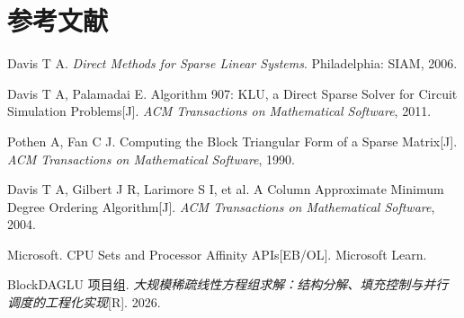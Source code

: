 \documentclass[12pt,a4paper,fontset=none]{ctexart}
\begin{document}
\section*{参考文献}

\begin{enumerate}[label={[}\arabic*{]}]
  \item Davis T A. \textit{Direct Methods for Sparse Linear Systems}. Philadelphia: SIAM, 2006.
  \item Davis T A, Palamadai E. Algorithm 907: KLU, a Direct Sparse Solver for Circuit Simulation Problems[J]. \textit{ACM Transactions on Mathematical Software}, 2011.
  \item Pothen A, Fan C J. Computing the Block Triangular Form of a Sparse Matrix[J]. \textit{ACM Transactions on Mathematical Software}, 1990.
  \item Davis T A, Gilbert J R, Larimore S I, et al. A Column Approximate Minimum Degree Ordering Algorithm[J]. \textit{ACM Transactions on Mathematical Software}, 2004.
  \item Microsoft. CPU Sets and Processor Affinity APIs[EB/OL]. Microsoft Learn.
  \item BlockDAGLU 项目组. \textit{大规模稀疏线性方程组求解：结构分解、填充控制与并行调度的工程化实现}[R]. 2026.
\end{enumerate}
\end{document}
